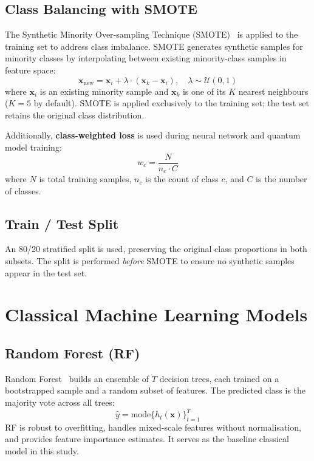 \documentclass[12pt, a4paper]{article}
\newcommand{\vect}[1]{\boldsymbol{#1}}
\begin{document}
\subsection{Class Balancing with SMOTE}
\label{sec:balancing}

The Synthetic Minority Over-sampling Technique (SMOTE)~\cite{chawla2002smote}
is applied to the training set to address class imbalance. SMOTE generates
synthetic samples for minority classes by interpolating between existing
minority-class samples in feature space:
\begin{equation}
    \vect{x}_{\text{new}} = \vect{x}_i + \lambda \cdot (\vect{x}_{k} - \vect{x}_i),
    \quad \lambda \sim \mathcal{U}(0,1)
\end{equation}
where $\vect{x}_i$ is an existing minority sample and $\vect{x}_k$ is one of
its $K$ nearest neighbours ($K=5$ by default). SMOTE is applied exclusively
to the training set; the test set retains the original class distribution.

Additionally, \textbf{class-weighted loss} is used during neural network and
quantum model training:
\begin{equation}
    w_c = \frac{N}{n_c \cdot C}
\end{equation}
where $N$ is total training samples, $n_c$ is the count of class $c$, and
$C$ is the number of classes.

\subsection{Train / Test Split}

An 80/20 stratified split is used, preserving the original class proportions
in both subsets. The split is performed \emph{before} SMOTE to ensure no
synthetic samples appear in the test set.

\section{Classical Machine Learning Models}
\label{sec:classical_ml}

\subsection{Random Forest (RF)}

Random Forest~\cite{breiman2001random} builds an ensemble of $T$ decision trees,
each trained on a bootstrapped sample and a random subset of features. The
predicted class is the majority vote across all trees:
\begin{equation}
    \hat{y} = \text{mode}\{h_t(\vect{x})\}_{t=1}^T
\end{equation}
RF is robust to overfitting, handles mixed-scale features without normalisation,
and provides feature importance estimates. It serves as the baseline classical
model in this study.
\end{document}
